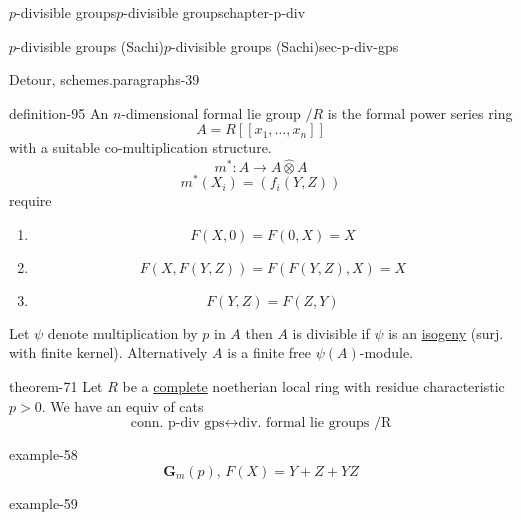 \documentclass[oneside,10pt,]{book}
\numberwithin{equation}{section}
\newcommand{\lb}{[}
\newcommand{\rb}{]}
\newcommand{\gt}{>}
\begin{document}
\begin{chapterptx}{\(p\)-divisible groups}{}{\(p\)-divisible groups}{}{}{chapter-p-div}
\begin{sectionptx}{\(p\)-divisible groups (Sachi)}{}{\(p\)-divisible groups (Sachi)}{}{}{sec-p-div-gps}
\begin{paragraphs}{Detour, schemes.}{paragraphs-39}
\begin{definition}{}{definition-95}%
\hypertarget{p-1006}{}%
An \(n\)-dimensional formal lie group \(/R\) is the formal power series ring%
\begin{equation*}
A = R\lb \lb x_1, \ldots, x_n \rb\rb
\end{equation*}
with a suitable co-multiplication structure.%
\begin{equation*}
m^* \colon A \to A\widehat \otimes A
\end{equation*}
%
\begin{equation*}
m^*(X_i) = (f_i(Y,Z))
\end{equation*}
require\leavevmode%
\begin{enumerate}
\item\hypertarget{li-256}{}%
\begin{equation*}
F(X,0) = F(0,X) = X
\end{equation*}
%
\item\hypertarget{li-257}{}%
\begin{equation*}
F(X,F(Y,Z)) = F(F(Y,Z),X) = X
\end{equation*}
%
\item\hypertarget{li-258}{}%
\begin{equation*}
F(Y,Z) = F(Z,Y)
\end{equation*}
%
\end{enumerate}
%
\end{definition}
\hypertarget{p-1007}{}%
Let \(\psi\) denote multiplication by \(p\) in \(A\) then \(A\) is divisible if \(\psi\) is an \hyperref[def-supersing-isog-isog]{isogeny} (surj. with finite kernel). Alternatively \(A\) is a finite free \(\psi (A)\)-module.%
\begin{theorem}{}{}{theorem-71}%
\hypertarget{p-1008}{}%
Let \(R\) be a \hyperref[def-abelian-complete-var]{complete} noetherian local ring with residue characteristic \(p \gt 0\). We have an equiv of cats%
\begin{equation*}
\text{conn. p-div gps} \leftrightarrow \text{div. formal lie groups /R}
\end{equation*}
%
\end{theorem}
\begin{example}{}{example-58}%
\hypertarget{p-1009}{}%
%
\begin{equation*}
\mathbf G_m(p) , \, F(X)= Y+Z+YZ
\end{equation*}
%
\end{example}
\begin{example}{}{example-59}%
\hypertarget{p-1010}{}%

\end{example}
\end{paragraphs}
\end{sectionptx}
\end{chapterptx}
\end{document}
